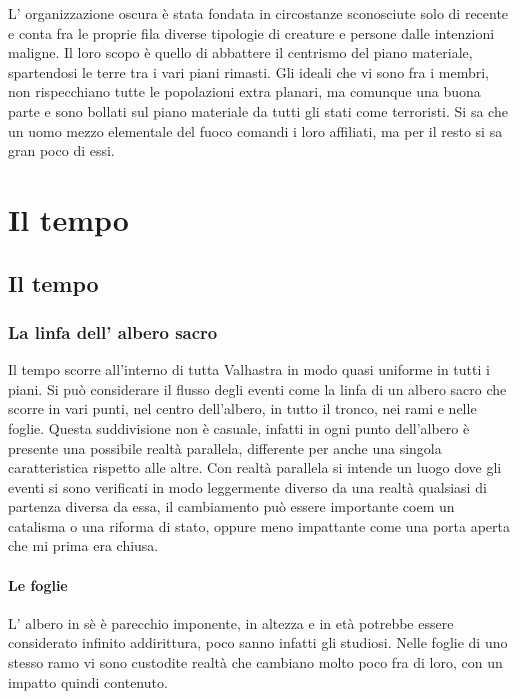 \documentclass[a4paper,12pt]{book}
\begin{document}
L' organizzazione oscura è stata fondata in circostanze sconosciute solo di recente e conta fra le proprie fila diverse tipologie di creature e persone dalle intenzioni maligne.
Il loro scopo è quello di abbattere il centrismo del piano materiale, spartendosi le terre tra i vari piani rimasti.
Gli ideali che vi sono fra i membri, non rispecchiano tutte le popolazioni extra planari, ma comunque una buona parte e sono bollati sul piano materiale da tutti gli stati come terroristi.
Si sa che un uomo mezzo elementale del fuoco comandi i loro affiliati, ma per il resto si sa gran poco di essi.

\saltariga
\chapter{Il tempo}
\section{Il tempo}

\subsection{La linfa dell' albero sacro}

Il tempo scorre all'interno di tutta Valhastra in modo quasi uniforme in tutti i piani.
Si può considerare il flusso degli eventi come la linfa di un albero sacro che scorre in vari punti, nel centro dell'albero, in tutto il tronco, nei rami e nelle foglie. Questa suddivisione non è casuale, infatti
in ogni punto dell'albero è presente una possibile realtà parallela, differente per anche una singola caratteristica rispetto alle altre.
Con realtà parallela si intende un luogo dove gli eventi si sono verificati in modo leggermente diverso da una realtà qualsiasi di partenza diversa da essa, il cambiamento può essere importante coem un catalisma o una riforma di stato, oppure meno impattante come una porta aperta che mi prima era chiusa.

\subsubsection{Le foglie}

L' albero in sè è parecchio imponente, in altezza e in età potrebbe essere considerato infinito addirittura, poco sanno infatti gli studiosi.
Nelle foglie di uno stesso ramo vi sono custodite realtà che cambiano molto poco fra di loro, con un impatto quindi contenuto.
\end{document}
